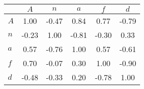 \begin{tabular}{lccccc}
\toprule
 & $A$ & $n$ & $a$ & $f$ & $d$ \\
\midrule
$A$ & {\cellcolor[HTML]{2C1A4C}} \color[HTML]{F1F1F1} 1.00 & {\cellcolor[HTML]{A1A167}} \color[HTML]{F1F1F1} -0.47 & {\cellcolor[HTML]{29396C}} \color[HTML]{F1F1F1} 0.84 & {\cellcolor[HTML]{28477A}} \color[HTML]{F1F1F1} 0.77 & {\cellcolor[HTML]{525224}} \color[HTML]{F1F1F1} -0.79 \\
$n$ & {\cellcolor[HTML]{D7D7AE}} \color[HTML]{000000} -0.23 & {\cellcolor[HTML]{2C1A4C}} \color[HTML]{F1F1F1} 1.00 & {\cellcolor[HTML]{4C4C20}} \color[HTML]{F1F1F1} -0.81 & {\cellcolor[HTML]{CBCB99}} \color[HTML]{000000} -0.30 & {\cellcolor[HTML]{8BA7C2}} \color[HTML]{F1F1F1} 0.33 \\
$a$ & {\cellcolor[HTML]{47729E}} \color[HTML]{F1F1F1} 0.57 & {\cellcolor[HTML]{59592A}} \color[HTML]{F1F1F1} -0.76 & {\cellcolor[HTML]{2C1A4C}} \color[HTML]{F1F1F1} 1.00 & {\cellcolor[HTML]{45719C}} \color[HTML]{F1F1F1} 0.57 & {\cellcolor[HTML]{7D7D48}} \color[HTML]{F1F1F1} -0.61 \\
$f$ & {\cellcolor[HTML]{2C5586}} \color[HTML]{F1F1F1} 0.70 & {\cellcolor[HTML]{EDEEDF}} \color[HTML]{000000} -0.07 & {\cellcolor[HTML]{94AEC7}} \color[HTML]{F1F1F1} 0.30 & {\cellcolor[HTML]{2C1A4C}} \color[HTML]{F1F1F1} 1.00 & {\cellcolor[HTML]{393911}} \color[HTML]{F1F1F1} -0.90 \\
$d$ & {\cellcolor[HTML]{9F9F65}} \color[HTML]{F1F1F1} -0.48 & {\cellcolor[HTML]{C5C58F}} \color[HTML]{000000} -0.33 & {\cellcolor[HTML]{B3C5D7}} \color[HTML]{000000} 0.20 & {\cellcolor[HTML]{555527}} \color[HTML]{F1F1F1} -0.78 & {\cellcolor[HTML]{2C1A4C}} \color[HTML]{F1F1F1} 1.00 \\
\bottomrule
\end{tabular}
